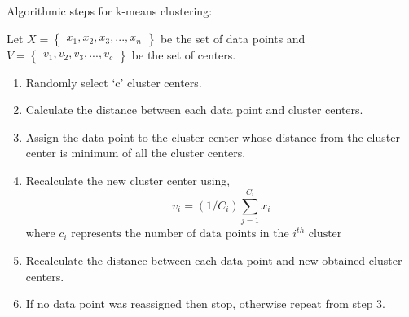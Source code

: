 Algorithmic steps for k-means clustering:

Let $X = \begin{Bmatrix} x_1,x_2,x_3,...,x_n \end{Bmatrix}$ be the set of data points and $V = \begin{Bmatrix} v_1,v_2,v_3,...,v_c \end{Bmatrix}$ be the set of centers.

\begin{enumerate}
	\item Randomly select ‘c’ cluster centers.
	\item Calculate the distance between each data point and cluster centers.
	\item Assign the data point to the cluster center whose distance from the cluster center is minimum of all the cluster centers.
	\item Recalculate the new cluster center using,
	\begin{equation} \label{eq: eq-4}
	v_i = (1/C_i)  \sum_{j=1}^{C_i}x_i
	\end{equation}
	where $c_i \text{ represents the number of data points in the $i_{}^{th}$ cluster}$
	\item Recalculate the distance between each data point and new obtained cluster centers.
	\item If no data point was reassigned then stop, otherwise repeat from step 3.	
\end{enumerate}


